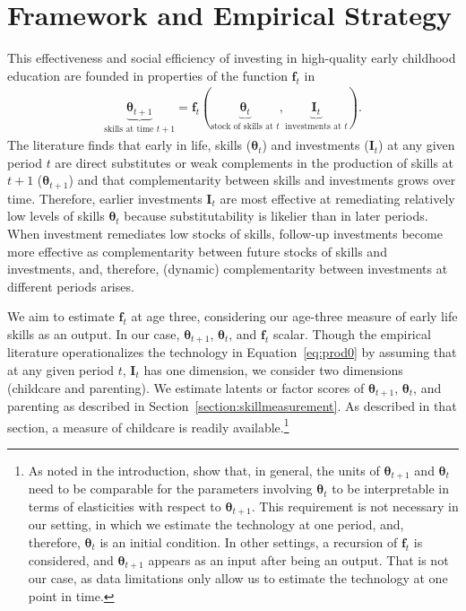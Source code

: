 \section{ Framework and Empirical Strategy} \label{section:empiricalstrategy}

\noindent This effectiveness and social efficiency of investing in high-quality early childhood education are founded in properties of the function $\bm{f}_{t}$ in
\begin{align} 
\underbrace{\bm{\theta}_{t+1}}_{\text{skills at time $t+1$}}  = \bm{f}_{t} \left( \underbrace{\bm{\theta}_t}_{\text{stock of skills at $t$}}, \underbrace{\bm{I}_t}_{\text{investments at $t$}}\right). \label{eq:prod0}
\end{align}
\noindent The literature finds that early in life, skills ($\bm{\theta}_t$) and investments ($\bm{I}_t$) at any given period $t$ are direct substitutes or weak complements in the production of skills at $t+1$ ($\bm{\theta}_{t+1}$) and that complementarity between skills and investments grows over time. Therefore, earlier investments $\bm{I}_t$ are most effective at remediating relatively low levels of skills $\bm{\theta}_t$ because substitutability is likelier than in later periods. When investment remediates low stocks of skills, follow-up investments become more effective as complementarity between future stocks of skills and investments, and,  therefore, (dynamic) complementarity between investments at different periods arises.

We aim to estimate $\bm{f}_{t}$ at age three, considering our age-three measure of early life skills as an output. In our case, $\bm{\theta}_{t+1}$, $\bm{\theta}_t$, and $\bm{f}_{t}$ scalar. Though the empirical literature operationalizes the technology in Equation~\eqref{eq:prod0} by assuming that at any given period $t$, $\bm{I}_t$ has one dimension, we consider two dimensions (childcare and parenting). We estimate latents or factor scores of $\bm{\theta}_{t+1}$, $\bm{\theta}_{t}$, and parenting as described in Section~\ref{section:skillmeasurement}. As described in that section, a measure of childcare is readily available.\footnote{As noted in the introduction, \citet{agostinelliIdentificationDynamicLatent2016} show that, in general, the units of $\bm{\theta}_{t+1}$ and $\bm{\theta}_{t}$ need to be comparable for the parameters involving $\bm{\theta}_{t}$ to be interpretable in terms of elasticities with respect to $\bm{\theta}_{t+1}$. This requirement is not necessary in our setting, in which we estimate the technology at one period, and, therefore, $\bm{\theta}_{t}$ is an initial condition. In other settings, a recursion of $\bm{f}_t$ is considered, and $\bm{\theta}_{t+1}$ appears as an input after being an output. That is not our case, as data limitations only allow us to estimate the technology at one point in time.}

